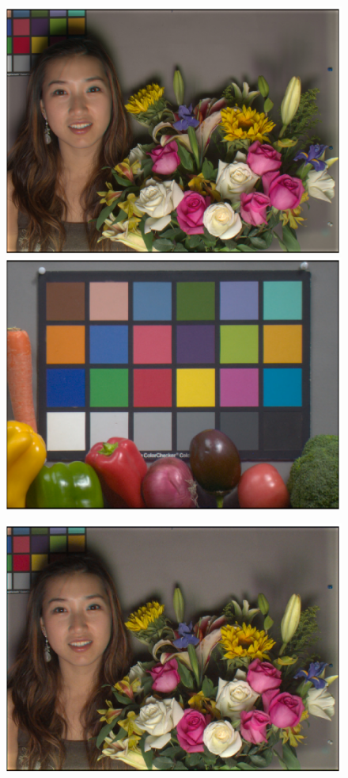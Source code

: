 \documentclass[]{spie}
\begin{document}
\begin{figure}[t]
\begin{center}
\begin{minipage}[b]{0.245\textwidth}
 \includegraphics[width=\textwidth]{Fig4/srgbI_AsianFemaleWithFlowers_RGBW1_Fluorescent1_opt1}
 \includegraphics[width=\textwidth]{Fig4/srgbI_Vegetables_RGBW1_Fluorescent1_opt1}
 \centering\small{}
\end{minipage}
\begin{minipage}[b]{0.245\textwidth}
 \includegraphics[width=\textwidth]{Fig4/srgbR_AsianFemaleWithFlowers_RGBW1_Fluorescent1_opt2}

\end{minipage}
\end{center}
\end{figure}
\end{document}
